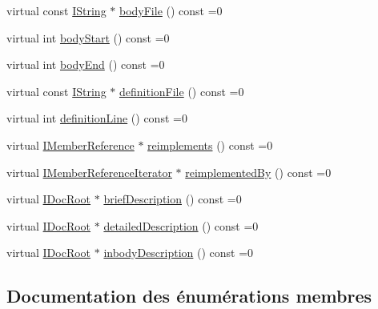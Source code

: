 \begin{DoxyCompactItemize}
\item 
virtual const \hyperlink{class_i_string}{I\+String} $\ast$ \hyperlink{class_i_member_a58a52b4fbe8e7c3a3bdca1306105e7ae}{body\+File} () const  =0
\item 
virtual int \hyperlink{class_i_member_a3b80e60713001a16807bcced90821411}{body\+Start} () const  =0
\item 
virtual int \hyperlink{class_i_member_a9ed675b0d760678569d05d9664e53ce4}{body\+End} () const  =0
\item 
virtual const \hyperlink{class_i_string}{I\+String} $\ast$ \hyperlink{class_i_member_a08a3b263193b7d79be0db598960cdb76}{definition\+File} () const  =0
\item 
virtual int \hyperlink{class_i_member_a6cf07097311f459830eab9f859365b4e}{definition\+Line} () const  =0
\item 
virtual \hyperlink{class_i_member_reference}{I\+Member\+Reference} $\ast$ \hyperlink{class_i_member_a34347c7caef10a2b738f9c7ee5e0764a}{reimplements} () const  =0
\item 
virtual \hyperlink{class_i_member_reference_iterator}{I\+Member\+Reference\+Iterator} $\ast$ \hyperlink{class_i_member_a24b6115f202192fd33f7adae4b2414a4}{reimplemented\+By} () const  =0
\item 
virtual \hyperlink{class_i_doc_root}{I\+Doc\+Root} $\ast$ \hyperlink{class_i_member_a88e7838b73ef93a6de88899a1e053ed7}{brief\+Description} () const  =0
\item 
virtual \hyperlink{class_i_doc_root}{I\+Doc\+Root} $\ast$ \hyperlink{class_i_member_a2639df9cac5aacfada1f72c88f425ca0}{detailed\+Description} () const  =0
\item 
virtual \hyperlink{class_i_doc_root}{I\+Doc\+Root} $\ast$ \hyperlink{class_i_member_addabc7d8fd182c2ae05c3ffee212c991}{inbody\+Description} () const  =0
\end{DoxyCompactItemize}


\subsection{Documentation des énumérations membres}
\hypertarget{class_i_member_ab486b4d2fdebc7a181e8dd0a09170956}{}
